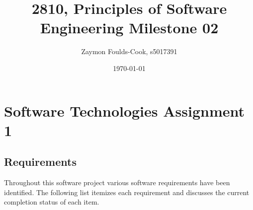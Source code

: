 \documentclass[12pt, a4]{report}
\title{2810, Principles of Software Engineering Milestone 02}
\author{Zaymon Foulds-Cook, s5017391}%
\date{\today}
\begin{document}
\begin{titlepage}
	\maketitle
\end{titlepage}

\tableofcontents
\pagebreak

%
%
\section{Software Technologies Assignment 1}
\subsection{Requirements}
\par Throughout this software project various software requirements have been identified. The following list itemizes each requirement and discusses the current completion status of each item.
\end{document}
